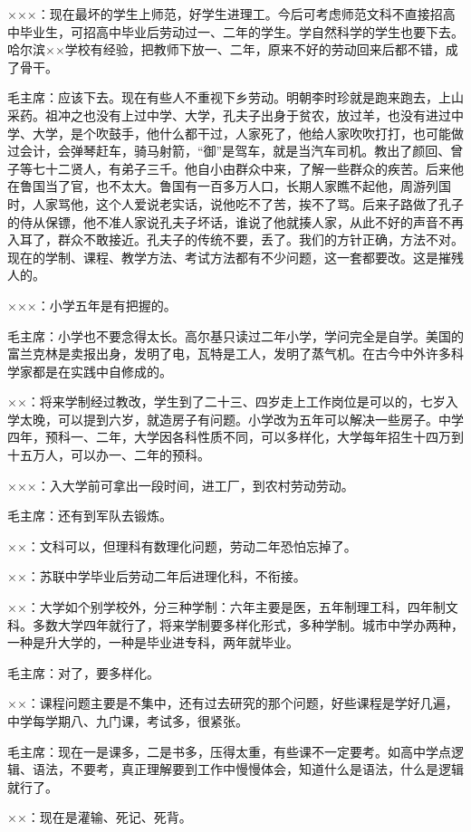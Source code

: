 ×××：现在最坏的学生上师范，好学生进理工。今后可考虑师范文科不直接招高中毕业生，可招高中毕业后劳动过一、二年的学生。学自然科学的学生也要下去。哈尔滨××学校有经验，把教师下放一、二年，原来不好的劳动回来后都不错，成了骨干。

毛主席：应该下去。现在有些人不重视下乡劳动。明朝李时珍就是跑来跑去，上山采药。祖冲之也没有上过中学、大学，孔夫子出身于贫农，放过羊，也没有进过中学、大学，是个吹鼓手，他什么都干过，人家死了，他给人家吹吹打打，也可能做过会计，会弹琴赶车，骑马射箭，“御”是驾车，就是当汽车司机。教出了颜回、曾子等七十二贤人，有弟子三千。他自小由群众中来，了解一些群众的疾苦。后来他在鲁国当了官，也不太大。鲁国有一百多万人口，长期人家瞧不起他，周游列国时，人家骂他，这个人爱说老实话，说他吃不了苦，挨不了骂。后来子路做了孔子的侍从保镖，他不准人家说孔夫子坏话，谁说了他就揍人家，从此不好的声音不再入耳了，群众不敢接近。孔夫子的传统不要，丢了。我们的方针正确，方法不对。现在的学制、课程、教学方法、考试方法都有不少问题，这一套都要改。这是摧残人的。

×××：小学五年是有把握的。

毛主席：小学也不要念得太长。高尔基只读过二年小学，学问完全是自学。美国的富兰克林是卖报出身，发明了电，瓦特是工人，发明了蒸气机。在古今中外许多科学家都是在实践中自修成的。

××：将来学制经过教改，学生到了二十三、四岁走上工作岗位是可以的，七岁入学太晚，可以提到六岁，就造房子有问题。小学改为五年可以解决一些房子。中学四年，预科一、二年，大学因各科性质不同，可以多样化，大学每年招生十四万到十五万人，可以办一、二年的预科。

×××：入大学前可拿出一段时间，进工厂，到农村劳动劳动。

毛主席：还有到军队去锻炼。

××：文科可以，但理科有数理化问题，劳动二年恐怕忘掉了。

××：苏联中学毕业后劳动二年后进理化科，不衔接。

××：大学如个别学校外，分三种学制：六年主要是医，五年制理工科，四年制文科。多数大学四年就行了，将来学制要多样化形式，多种学制。城市中学办两种，一种是升大学的，一种是毕业进专科，两年就毕业。

毛主席：对了，要多样化。

××：课程问题主要是不集中，还有过去研究的那个问题，好些课程是学好几遍，中学每学期八、九门课，考试多，很紧张。

毛主席：现在一是课多，二是书多，压得太重，有些课不一定要考。如高中学点逻辑、语法，不要考，真正理解要到工作中慢慢体会，知道什么是语法，什么是逻辑就行了。

××：现在是灌输、死记、死背。

